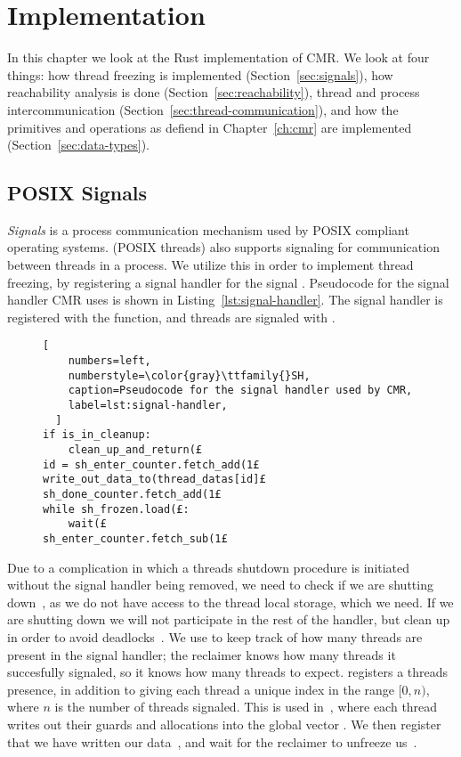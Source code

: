 \chapter{Implementation}

In this chapter we look at the Rust implementation of CMR\@.  We look at four things: how thread
freezing is implemented (Section~\ref{sec:signals}), how reachability analysis is done
(Section~\ref{sec:reachability}), thread and process intercommunication
(Section~\ref{sec:thread-communication}), and how the primitives and operations as defiend in
Chapter~\ref{ch:cmr} are implemented (Section~\ref{sec:data-types}).


\section{POSIX Signals\label{sec:signals}}

\emph{Signals} is a process communication mechanism used by POSIX compliant operating systems.
 (POSIX threads) also supports signaling for communication between threads in a
process. We utilize this in order to implement thread freezing, by registering a signal handler for
the signal . Pseudocode for the signal handler CMR uses is shown in
Listing~\ref{lst:signal-handler}. The signal handler is registered with the 
function, and threads are signaled with .

\begin{figure}[b]
  \begin{lstlisting}[
    numbers=left,
    numberstyle=\color{gray}\ttfamily{}SH,
    caption=Pseudocode for the signal handler used by CMR,
    label=lst:signal-handler,
  ]
if is_in_cleanup:
    clean_up_and_return(£
id = sh_enter_counter.fetch_add(1£
write_out_data_to(thread_datas[id]£
sh_done_counter.fetch_add(1£
while sh_frozen.load(£:
    wait(£
sh_enter_counter.fetch_sub(1£\end{lstlisting}
\end{figure}

Due to a complication in which a threads shutdown procedure is initiated without the signal handler
being removed, we need to check if we are shutting down~, as we do not have access to
the thread local storage, which we need. If we are shutting down we will not participate in the
rest of the handler, but clean up in order to avoid deadlocks~.
We use  to keep track of how many threads are present in the signal handler;
the reclaimer knows how many threads it succesfully signaled, so it knows how many threads to
expect.  registers a threads presence, in addition to giving each thread a unique
index in the range $[0, n)$, where $n$ is the number of threads signaled. This is used
in~, where each thread writes out their guards and allocations into the global vector
. We then register that we have written our data~, and wait for the
reclaimer to unfreeze us~.




